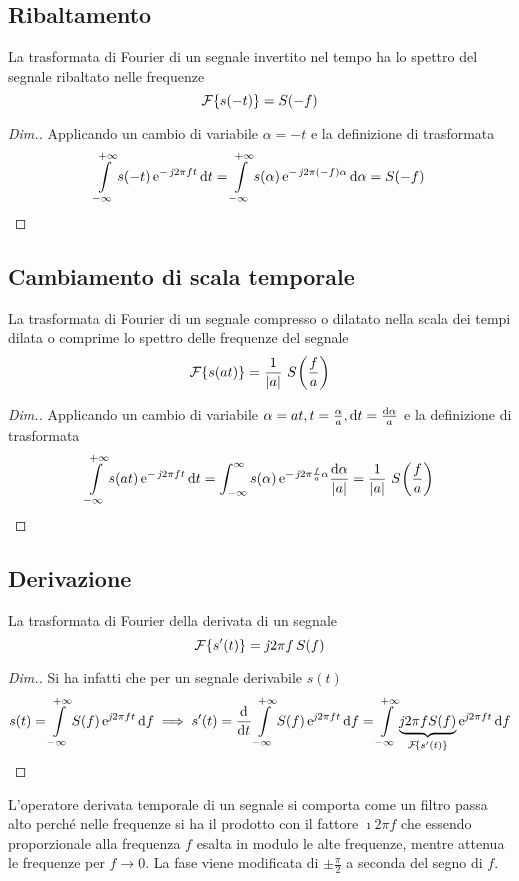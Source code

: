 \subsection{Ribaltamento}
La trasformata di Fourier di un segnale invertito nel tempo ha lo spettro del segnale ribaltato nelle frequenze
\begin{equation}\operatorname{\mathcal{F}}\!\left\lbrace{s(-t)}\right\rbrace=S(-f)\end{equation}
\begin{proof}[Dim.]
Applicando un cambio di variabile $\alpha=-t$ e la definizione di trasformata
\[\int\limits_{-\infty}^{+\infty}{s(-t)\operatorname{e}^{-\operatorname{\mathit{j}\!} 2\pi f t}}{\,\mathop{}\!\mathrm{d}{t}}=
\int\limits_{-\infty}^{+\infty}{s(\alpha)\operatorname{e}^{-\operatorname{\mathit{j}\!} 2\pi (-f)\alpha}}{\,\mathop{}\!\mathrm{d}{\alpha}}=S(-f)\]
\end{proof}

\subsection{Cambiamento di scala temporale}
La trasformata di Fourier di un segnale compresso o dilatato nella scala dei tempi dilata o comprime lo spettro delle frequenze del segnale
\begin{equation}\label{eq:trasf_Fourier_scala}
\operatorname{\mathcal{F}}\!\left\lbrace{s(a t)}\right\rbrace=\frac{1}{\left|{a}\right|}\,\,{S}^{}\!\left({\frac{f}{a}}\right)
\end{equation}
\begin{proof}[Dim.] Applicando un cambio di variabile $\alpha=a t, t=\frac{\alpha}{a}, \mathop{}\!\mathrm{d} t=\frac{\mathop{}\!\mathrm{d}\alpha}{a}$ e la definizione di trasformata
\[\int\limits_{-\infty}^{+\infty}{s(a t)\operatorname{e}^{-\operatorname{\mathit{j}\!} 2\pi f t}}{\,\mathop{}\!\mathrm{d}{t}}=
\int_{-\infty}^{\infty}{s(\alpha)\operatorname{e}^{-\operatorname{\mathit{j}\!} 2\pi\frac{f}{a}\alpha}}{\frac{\mathop{}\!\mathrm{d}\alpha}{\left|{a}\right|}}=\frac{1}{\left|{a}\right|}\,\,{S}^{}\!\left({\frac{f}{a}}\right)\]
\end{proof}

\subsection{Derivazione}
La trasformata di Fourier della derivata di un segnale
\begin{equation}
\operatorname{\mathcal{F}}\!\left\lbrace{s'(t)}\right\rbrace=\operatorname{\mathit{j}\!} 2\pi f\,S(f)
\end{equation}
\begin{proof}[Dim.] Si ha infatti che per un segnale derivabile $s(t)$
\[s(t)=\intinf{S(f)\e{\imath 2\pi f t}}{f}\implies s'(t)=\deriv{}{t}\intinf{S(f)\e{\imath 2\pi f t}}{f}=
\intinf{ \underbrace{\imath 2\pi f S(f)}_{\fourier{s'(t)}}\e{\imath 2\pi f t}}{f} \]
\end{proof}

\begin{nota}L'operatore derivata temporale di un segnale si comporta come un filtro passa alto perché nelle frequenze si ha il prodotto con il fattore $\imath 2\pi f$ che essendo proporzionale alla frequenza $f$ esalta in modulo le alte frequenze, mentre attenua le frequenze per $f\to 0$. La fase viene modificata di $\pm\frac{\pi}{2}$ a seconda del segno di $f$.\end{nota}


